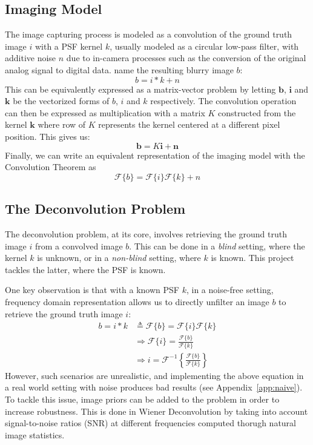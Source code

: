 \documentclass[sigconf]{acmart}
\begin{document}
\subsection{Imaging Model}
The image capturing process is modeled as a convolution of the ground truth image $i$ with a PSF kernel $k$, usually modeled as a circular low-pass filter, with additive noise $n$ due to in-camera processes such as the conversion of the original analog signal to digital data.  name the resulting blurry image $b$:
$$b = i*k + n$$
This can be equivalently expressed as a matrix-vector problem by letting $\mathbf{b}$, $\mathbf{i}$ and $\mathbf{k}$ be the vectorized forms of $b$, $i$ and $k$ respectively. The convolution operation can then be expressed as multiplication with a matrix $K$ constructed from the kernel $\mathbf{k}$ where row of $K$ represents the kernel centered at a different pixel position. This gives us:
$$\mathbf{b} = K\mathbf{i} + \mathbf{n}$$
Finally, we can write an equivalent representation of the imaging model with the Convolution Theorem as
$$\mathcal{F}\{b\} = \mathcal{F}\{i\}\mathcal{F}\{k\} + n$$
\subsection{The Deconvolution Problem}
The deconvolution problem, at its core, involves retrieving the ground truth image $i$ from a convolved image $b$. This can be done in a \textit{blind} setting, where the kernel $k$ is unknown, or in a \textit{non-blind} setting, where $k$ is known. This project tackles the latter, where the PSF is known. 

One key observation is that with a known PSF $k$, in a noise-free setting, frequency domain representation allows us to directly unfilter an image $b$ to retrieve the ground truth image $i$:
\begin{align*}
    b = i*k &\triangleq \mathcal{F}\{b\} = \mathcal{F}\{i\}\mathcal{F}\{k\}\\
    &\Rightarrow \mathcal{F}\{i\} = \frac{\mathcal{F}\{b\}}{\mathcal{F}\{k\}}\\
    &\Rightarrow i = \mathcal{F}^{-1}\left\{\frac{\mathcal{F}\{b\}}{\mathcal{F}\{k\}}\right\}
\end{align*}
However, such scenarios are unrealistic, and implementing the above equation in a real world setting with noise produces bad results (see Appendix~\ref{app:naive}). To tackle this issue, image priors can be added to the problem in order to increase robustness. This is done in Wiener Deconvolution by taking into account signal-to-noise ratios (SNR) at different frequencies computed thorugh natural image statistics.
\end{document}
